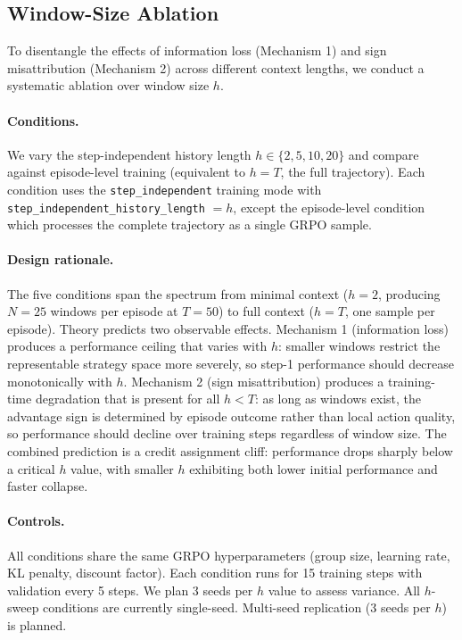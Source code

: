 \subsection{Window-Size Ablation}
\label{sec:window_ablation}

To disentangle the effects of information loss (Mechanism 1) and sign misattribution (Mechanism 2) across different context lengths, we conduct a systematic ablation over window size $h$.

\paragraph{Conditions.}
We vary the step-independent history length $h \in \{2, 5, 10, 20\}$ and compare against episode-level training (equivalent to $h = T$, the full trajectory). Each condition uses the \texttt{step\_independent} training mode with \texttt{step\_independent\_history\_length} $= h$, except the episode-level condition which processes the complete trajectory as a single GRPO sample.

\paragraph{Design rationale.}
The five conditions span the spectrum from minimal context ($h = 2$, producing $N = 25$ windows per episode at $T = 50$) to full context ($h = T$, one sample per episode). Theory predicts two observable effects. Mechanism 1 (information loss) produces a performance ceiling that varies with $h$: smaller windows restrict the representable strategy space more severely, so step-1 performance should decrease monotonically with $h$. Mechanism 2 (sign misattribution) produces a training-time degradation that is present for all $h < T$: as long as windows exist, the advantage sign is determined by episode outcome rather than local action quality, so performance should decline over training steps regardless of window size. The combined prediction is a credit assignment cliff: performance drops sharply below a critical $h$ value, with smaller $h$ exhibiting both lower initial performance and faster collapse.

\paragraph{Controls.}
All conditions share the same GRPO hyperparameters (group size, learning rate, KL penalty, discount factor). Each condition runs for 15 training steps with validation every 5 steps. We plan 3 seeds per $h$ value to assess variance. All $h$-sweep conditions are currently single-seed. Multi-seed replication (3 seeds per $h$) is planned.%


